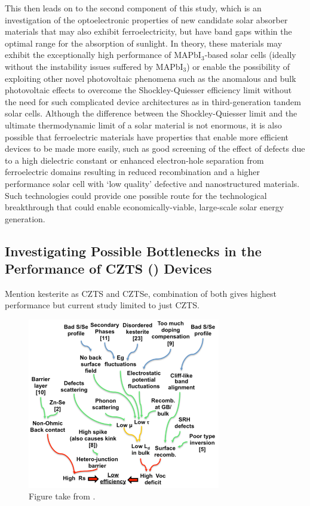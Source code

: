This then leads on to the second component of this study, which is an investigation of the optoelectronic properties of new candidate solar absorber materials that may also exhibit ferroelectricity, but have band gaps within the optimal range for the absorption of sunlight. In theory, these materials may exhibit the exceptionally high performance of MAPbI$_3$-based solar cells (ideally without the instability issues suffered by MAPbI$_3$) or enable the possibility of exploiting other novel photovoltaic phenomena such as the anomalous and bulk photovoltaic effects to overcome the Shockley-Quiesser efficiency limit without the need for such complicated device architectures as in third-generation tandem solar cells. Although the difference between the Shockley-Quiesser limit and the ultimate thermodynamic limit of a solar material is not enormous, it is also possible that ferroelectric materials have properties that enable more efficient devices to be made more easily, such as good screening of the effect of defects due to a high dielectric constant or enhanced electron-hole separation from ferroelectric domains resulting in reduced recombination and a higher performance solar cell with `low quality' defective and nanostructured materials. Such technologies could provide one possible route for the technological breakthrough that could enable economically-viable, large-scale solar energy generation.

\subsection{Investigating Possible Bottlenecks in the Performance of CZTS (\CZTS) Devices}

Mention kesterite as CZTS and CZTSe, combination of both gives highest performance but current study limited to just CZTS.

\begin{figure}[h!]
  \centering
    \includegraphics[width=0.75\textwidth]{figures/kesterite_bottlenecks.png}
    \caption{Figure take from .}
  \label{kesterite_bottlenecks}
\end{figure}

